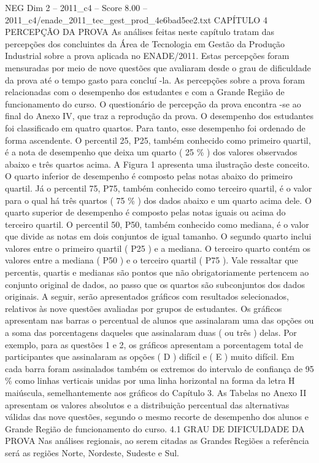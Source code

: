 \begin{textsample}{NEG Dim 2 – 2011\_c4 – Score 8.00 – 2011\_c4/enade\_2011\_tec\_gest\_prod\_4e6bad5ee2.txt}  \label{ex:f2_neg_307}
CAPÍTULO 4 PERCEPÇÃO DA PROVA As análises feitas neste capítulo tratam das percepções dos concluintes da Área de Tecnologia em Gestão da Produção Industrial sobre a prova aplicada no ENADE/2011.
Estas percepções foram mensuradas por meio de nove questões que avaliaram desde o grau de dificuldade da prova até o tempo gasto para concluí -la.
As percepções sobre a prova foram relacionadas com o desempenho dos estudantes e com a Grande Região de funcionamento do curso.
O questionário de percepção da prova encontra -se ao final do Anexo IV, que traz a reprodução da prova.
O desempenho dos estudantes foi classificado em quatro quartos.
Para tanto, esse desempenho foi ordenado de forma ascendente.
O percentil 25, P25, também conhecido como primeiro quartil, é a nota de desempenho que deixa um quarto ( 25 \% ) dos valores observados abaixo e três quartos acima.
A Figura 1 apresenta uma ilustração deste conceito.
O quarto inferior de desempenho é composto pelas notas abaixo do primeiro quartil.
Já o percentil 75, P75, também conhecido como terceiro quartil, é o valor para o qual há três quartos ( 75 \% ) dos dados abaixo e um quarto acima dele.
O quarto superior de desempenho é composto pelas notas iguais ou acima do terceiro quartil.
O percentil 50, P50, também conhecido como mediana, é o valor que divide as notas em dois conjuntos de igual tamanho.
O segundo quarto inclui valores entre o primeiro quartil ( P25 ) e a mediana.
O terceiro quarto contém os valores entre a mediana ( P50 ) e o terceiro quartil ( P75 ).
Vale ressaltar que percentis, quartis e medianas são pontos que não obrigatoriamente pertencem ao conjunto original de dados, ao passo que os quartos são subconjuntos dos dados originais.
A seguir, serão apresentados gráficos com resultados selecionados, relativos às nove questões avaliadas por grupos de estudantes.
Os gráficos apresentam nas barras o percentual de alunos que assinalaram uma das opções ou a soma das porcentagens daqueles que assinalaram duas ( ou três ) delas.
Por exemplo, para as questões 1 e 2, os gráficos apresentam a porcentagem total de participantes que assinalaram as opções ( D ) difícil e ( E ) muito difícil.
Em cada barra foram assinalados também os extremos do intervalo de confiança de 95 \% como linhas verticais unidas por uma linha horizontal na forma da letra H maiúscula, semelhantemente aos gráficos do Capítulo 3.
As Tabelas no Anexo II apresentam os valores absolutos e a distribuição percentual das alternativas válidas das nove questões, segundo o mesmo recorte de desempenho dos alunos e Grande Região de funcionamento do curso. 4.1 GRAU DE DIFICULDADE DA PROVA Nas análises regionais, ao serem citadas as Grandes Regiões a referência será as regiões Norte, Nordeste, Sudeste e Sul.

\end{textsample}
